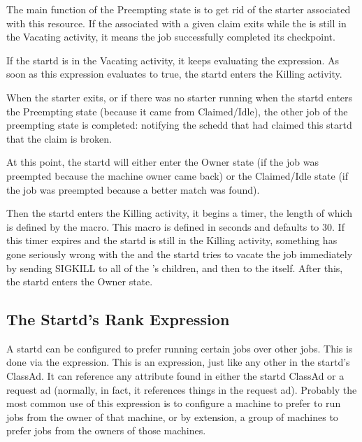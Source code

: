 The main function of the Preempting state is to get rid of the starter
associated with this resource.  If the  associated
with a given claim exits while the  is still in the
Vacating activity, it means the job successfully completed its
checkpoint.

If the startd is in the Vacating activity, it keeps evaluating the
 expression.  As soon as this expression evaluates to true,
the startd enters the Killing activity.

When the starter exits, or if there was no starter running when the
startd enters the Preempting state (because it came from
Claimed/Idle), the other job of the preempting state is completed:
notifying the schedd that had claimed this startd that the claim is
broken.

At this point, the startd will either enter the Owner state (if the
job was preempted because the machine owner came back) or the
Claimed/Idle state (if the job was preempted because a better match
was found).

Then the startd enters the Killing activity, it begins a timer, the
length of which is defined by the 
\label{param:KillingTimeout} macro.  This macro is defined in seconds 
and defaults to 30.  If this timer expires and the startd is still in
the Killing activity, something has gone seriously wrong with the
 and the startd tries to vacate the job immediately by
sending SIGKILL to all of the 's children, and then to
the  itself.  After this, the startd enters the Owner
state.  



\subsection{The Startd's Rank Expression}
\label{sec:Rank-Expression}

A startd can be configured to prefer running certain jobs over other
jobs.  This is done via the  expression.  This is an
expression, just like any other in the startd's ClassAd.  It can
reference any attribute found in either the startd ClassAd or a
request ad (normally, in fact, it references things in the request
ad).  Probably the most common use of this expression is to configure a
machine to prefer to run jobs from the owner of that machine, or by
extension, a group of machines to prefer jobs from the owners of those
machines.  

